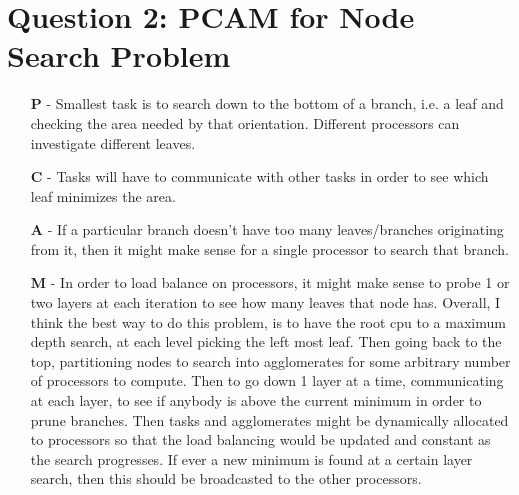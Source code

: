\documentclass{article}
\begin{document}
\section*{Question 2: PCAM for Node Search Problem}
\begin{enumerate}
               
    \item[\textbf{P} -] Smallest task is to search down to the bottom of a
    branch, i.e. a leaf and checking the area needed by that orientation.
    Different processors can investigate different leaves. 
               
    \item[\textbf{C} -] Tasks will have to communicate with other tasks in order
    to see which leaf minimizes the area. 
               
    \item[\textbf{A} -] If a particular branch doesn't have too many
    leaves/branches originating from it, then it might make sense for a single
    processor to search that branch. 
               
    \item[\textbf{M} -] In order to load balance on processors, it might make
    sense to probe 1 or two layers at each iteration to see how many leaves that
    node has. Overall, I think the best way to do this problem, is to have the
    root cpu to a maximum depth search, at each level picking the left most
    leaf. Then going back to the top, partitioning nodes to search into
    agglomerates for some arbitrary number of processors to compute. Then to go
    down 1 layer at a time, communicating at each layer, to see if anybody is
    above the current minimum in order to prune branches. Then tasks and
    agglomerates might be dynamically allocated to processors so that the load
    balancing would be updated and constant as the search progresses. If ever a
    new minimum is found at a certain layer search, then this should be
    broadcasted to the other processors. 

\end{enumerate}
\end{document}
